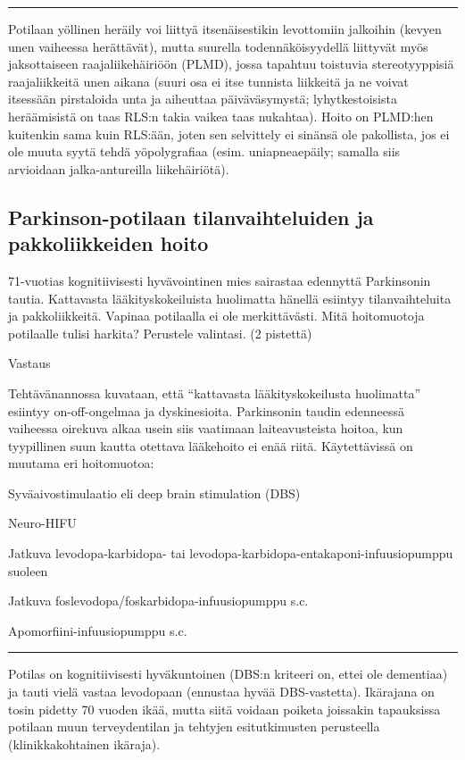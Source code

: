 \documentclass[
]{book}
\begin{document}
\begin{center}\rule{0.5\linewidth}{0.5pt}\end{center}

Potilaan yöllinen heräily voi liittyä itsenäisestikin levottomiin jalkoihin (kevyen unen vaiheessa herättävät), mutta suurella todennäköisyydellä liittyvät myös jaksottaiseen raajaliikehäiriöön (PLMD), jossa tapahtuu toistuvia stereotyyppisiä raajaliikkeitä unen aikana (suuri osa ei itse tunnista liikkeitä ja ne voivat itsessään pirstaloida unta ja aiheuttaa päiväväsymystä; lyhytkestoisista heräämisistä on taas RLS:n takia vaikea taas nukahtaa). Hoito on PLMD:hen kuitenkin sama kuin RLS:ään, joten sen selvittely ei sinänsä ole pakollista, jos ei ole muuta syytä tehdä yöpolygrafiaa (esim. uniapneaepäily; samalla siis arvioidaan jalka-antureilla liikehäiriötä).

\subsection{Parkinson-potilaan tilanvaihteluiden ja pakkoliikkeiden hoito}\label{parkinson-potilaan-tilanvaihteluiden-ja-pakkoliikkeiden-hoito}

71-vuotias kognitiivisesti hyvävointinen mies sairastaa edennyttä Parkinsonin tautia. Kattavasta lääkityskokeiluista huolimatta hänellä esiintyy tilanvaihteluita ja pakkoliikkeitä. Vapinaa potilaalla ei ole merkittävästi. Mitä hoitomuotoja potilaalle tulisi harkita? Perustele valintasi. (2 pistettä)

Vastaus

Tehtävänannossa kuvataan, että ``kattavasta lääkityskokeilusta huolimatta'' esiintyy on-off-ongelmaa ja dyskinesioita. Parkinsonin taudin edenneessä vaiheessa oirekuva alkaa usein siis vaatimaan laiteavusteista hoitoa, kun tyypillinen suun kautta otettava lääkehoito ei enää riitä. Käytettävissä on muutama eri hoitomuotoa:

Syväaivostimulaatio eli deep brain stimulation (DBS)

Neuro-HIFU

Jatkuva levodopa-karbidopa- tai levodopa-karbidopa-entakaponi-infuusiopumppu suoleen

Jatkuva foslevodopa/foskarbidopa-infuusiopumppu s.c.

Apomorfiini-infuusiopumppu s.c.

\begin{center}\rule{0.5\linewidth}{0.5pt}\end{center}

Potilas on kognitiivisesti hyväkuntoinen (DBS:n kriteeri on, ettei ole dementiaa) ja tauti vielä vastaa levodopaan (ennustaa hyvää DBS-vastetta). Ikärajana on tosin pidetty 70 vuoden ikää, mutta siitä voidaan poiketa joissakin tapauksissa potilaan muun terveydentilan ja tehtyjen esitutkimusten perusteella (klinikkakohtainen ikäraja).
\end{document}
